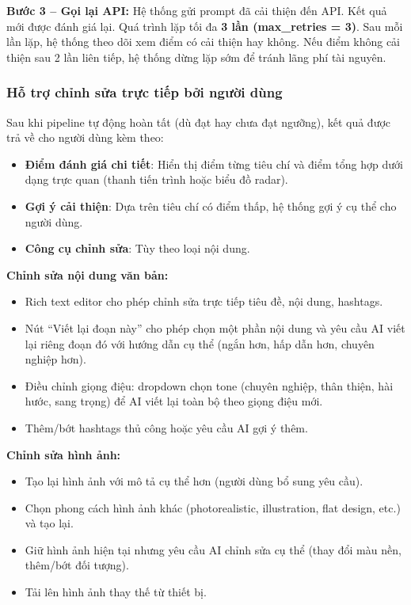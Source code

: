 \textbf{Bước 3 -- Gọi lại API:} Hệ thống gửi prompt đã cải thiện đến API. Kết quả mới được đánh giá lại. Quá trình lặp tối đa \textbf{3 lần (max\_retries = 3)}. Sau mỗi lần lặp, hệ thống theo dõi xem điểm có cải thiện hay không. Nếu điểm không cải thiện sau 2 lần liên tiếp, hệ thống dừng lặp sớm để tránh lãng phí tài nguyên.

\subsubsection{Hỗ trợ chỉnh sửa trực tiếp bởi người dùng}

Sau khi pipeline tự động hoàn tất (dù đạt hay chưa đạt ngưỡng), kết quả được trả về cho người dùng kèm theo:

\begin{itemize}
    \item \textbf{Điểm đánh giá chi tiết}: Hiển thị điểm từng tiêu chí và điểm tổng hợp dưới dạng trực quan (thanh tiến trình hoặc biểu đồ radar).
    \item \textbf{Gợi ý cải thiện}: Dựa trên tiêu chí có điểm thấp, hệ thống gợi ý cụ thể cho người dùng.
    \item \textbf{Công cụ chỉnh sửa}: Tùy theo loại nội dung.
\end{itemize}

\textbf{Chỉnh sửa nội dung văn bản:}
\begin{itemize}
    \item Rich text editor cho phép chỉnh sửa trực tiếp tiêu đề, nội dung, hashtags.
    \item Nút ``Viết lại đoạn này'' cho phép chọn một phần nội dung và yêu cầu AI viết lại riêng đoạn đó với hướng dẫn cụ thể (ngắn hơn, hấp dẫn hơn, chuyên nghiệp hơn).
    \item Điều chỉnh giọng điệu: dropdown chọn tone (chuyên nghiệp, thân thiện, hài hước, sang trọng) để AI viết lại toàn bộ theo giọng điệu mới.
    \item Thêm/bớt hashtags thủ công hoặc yêu cầu AI gợi ý thêm.
\end{itemize}

\textbf{Chỉnh sửa hình ảnh:}
\begin{itemize}
    \item Tạo lại hình ảnh với mô tả cụ thể hơn (người dùng bổ sung yêu cầu).
    \item Chọn phong cách hình ảnh khác (photorealistic, illustration, flat design, etc.) và tạo lại.
    \item Giữ hình ảnh hiện tại nhưng yêu cầu AI chỉnh sửa cụ thể (thay đổi màu nền, thêm/bớt đối tượng).
    \item Tải lên hình ảnh thay thế từ thiết bị.
\end{itemize}

